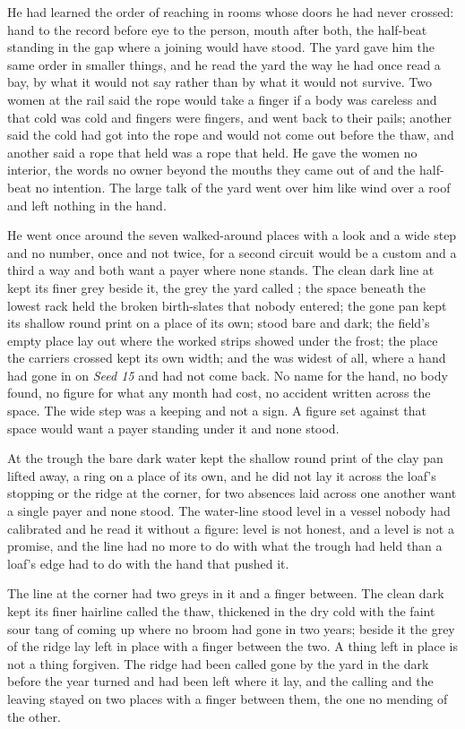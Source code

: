 He had learned the order of reaching in rooms whose doors he had never crossed: hand to the record before eye to the person, mouth after both, the half-beat standing in the gap where a joining would have stood. The yard gave him the same order in smaller things, and he read the yard the way he had once read a bay, by what it would not say rather than by what it would not survive. Two women at the rail said the rope would take a finger if a body was careless and that cold was cold and fingers were fingers, and went back to their pails; another said the cold had got into the rope and would not come out before the thaw, and another said a rope that held was a rope that held. He gave the women no interior, the words no owner beyond the mouths they came out of and the half-beat no intention. The large talk of the yard went over him like wind over a roof and left nothing in the hand.

He went once around the seven walked-around places with a look and a wide step and no number, once and not twice, for a second circuit would be a custom and a third a way and both want a payer where none stands. The clean dark line at  kept its finer grey beside it, the grey the yard called ; the space beneath the lowest rack held the broken birth-slates that nobody entered; the gone pan kept its shallow round print on a place of its own;  stood bare and dark; the field's empty place lay out where the worked strips showed under the frost; the place the carriers crossed kept its own width; and the  was widest of all, where a hand had gone in on \emph{Seed 15} and had not come back. No name for the hand, no body found, no figure for what any month had cost, no accident written across the space. The wide step was a keeping and not a sign. A figure set against that space would want a payer standing under it and none stood.

At the trough the bare dark water kept the shallow round print of the clay pan lifted away, a ring on a place of its own, and he did not lay it across the loaf's stopping or the ridge at the corner, for two absences laid across one another want a single payer and none stood. The water-line stood level in a vessel nobody had calibrated and he read it without a figure: level is not honest, and a level is not a promise, and the line had no more to do with what the trough had held than a loaf's edge had to do with the hand that pushed it.

The line at the corner had two greys in it and a finger between. The clean dark kept its finer hairline called the thaw, thickened in the dry cold with the faint sour tang of  coming up where no broom had gone in two years; beside it the grey of the ridge lay left in place with a finger between the two. A thing left in place is not a thing forgiven. The ridge had been called gone by the yard in the dark before the year turned and had been left where it lay, and the calling and the leaving stayed on two places with a finger between them, the one no mending of the other.

